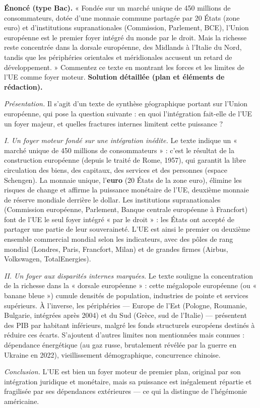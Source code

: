 \documentclass[11pt]{article}
\begin{document}
\begin{exoresolu}
\textbf{Énoncé (type Bac).} « Fondée sur un marché unique de 450 millions de consommateurs, dotée d'une monnaie commune partagée par 20 États (zone euro) et d'institutions supranationales (Commission, Parlement, BCE), l'Union européenne est le premier foyer intégré du monde par le droit. Mais la richesse reste concentrée dans la dorsale européenne, des Midlands à l'Italie du Nord, tandis que les périphéries orientales et méridionales accusent un retard de développement. » Commentez ce texte en montrant les forces et les limites de l'UE comme foyer moteur.
\tcblower
\textbf{Solution détaillée (plan et éléments de rédaction).}

\emph{Présentation.} Il s'agit d'un texte de synthèse géographique portant sur l'Union européenne, qui pose la question suivante : en quoi l'intégration fait-elle de l'UE un foyer majeur, et quelles fractures internes limitent cette puissance ?

\emph{I. Un foyer moteur fondé sur une intégration inédite.} Le texte indique un « marché unique de 450 millions de consommateurs » : c'est le résultat de la construction européenne (depuis le traité de Rome, 1957), qui garantit la libre circulation des biens, des capitaux, des services et des personnes (espace Schengen). La monnaie unique, l'\textbf{euro} (20 États de la zone euro), élimine les risques de change et affirme la puissance monétaire de l'UE, deuxième monnaie de réserve mondiale derrière le dollar. Les institutions supranationales (Commission européenne, Parlement, Banque centrale européenne à Francfort) font de l'UE le seul foyer intégré « par le droit » : les États ont accepté de partager une partie de leur souveraineté. L'UE est ainsi le premier ou deuxième ensemble commercial mondial selon les indicateurs, avec des pôles de rang mondial (Londres, Paris, Francfort, Milan) et de grandes firmes (Airbus, Volkswagen, TotalEnergies).

\emph{II. Un foyer aux disparités internes marquées.} Le texte souligne la concentration de la richesse dans la « dorsale européenne » : cette mégalopole européenne (ou « banane bleue ») cumule densités de population, industries de pointe et services supérieurs. À l'inverse, les périphéries — Europe de l'Est (Pologne, Roumanie, Bulgarie, intégrées après 2004) et du Sud (Grèce, sud de l'Italie) — présentent des PIB par habitant inférieurs, malgré les fonds structurels européens destinés à réduire ces écarts. S'ajoutent d'autres limites non mentionnées mais connues : dépendance énergétique (au gaz russe, brutalement révélée par la guerre en Ukraine en 2022), vieillissement démographique, concurrence chinoise.

\emph{Conclusion.} L'UE est bien un foyer moteur de premier plan, original par son intégration juridique et monétaire, mais sa puissance est inégalement répartie et fragilisée par ses dépendances extérieures — ce qui la distingue de l'hégémonie américaine.
\end{exoresolu}
\end{document}
